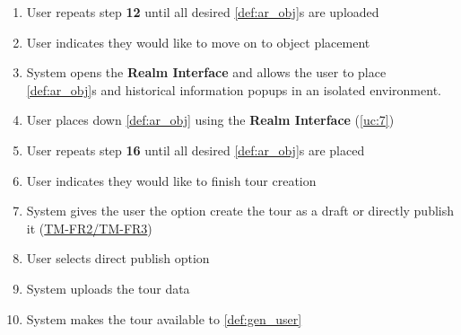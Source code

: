 \documentclass{article}
\begin{document}
\begin{enumerate}[label=\textbf{UC\arabic*}]
\begin{enumerate}[label=\textbf{\arabic*.}]
              \item User repeats step \textbf{12} until all desired \ref{def:ar_obj}s are uploaded
              \item User indicates they would like to move on to object placement
              \item System opens the \textbf{Realm Interface} and allows the user to place \ref{def:ar_obj}s and historical information popups in an isolated environment.
              \item User places down \ref{def:ar_obj} using the \textbf{Realm Interface} (\ref{uc:7})
              \item User repeats step \textbf{16} until all desired \ref{def:ar_obj}s are placed
              \item User indicates they would like to finish tour creation
              \item System gives the user the option create the tour as a draft or directly publish it (\hyperref[ssub:tour_management]{TM-FR2/TM-FR3})
              \item User selects direct publish option
              \item System uploads the tour data
              \item System makes the tour available to \ref{def:gen_user}
          \end{enumerate}


\end{enumerate}
\end{document}
